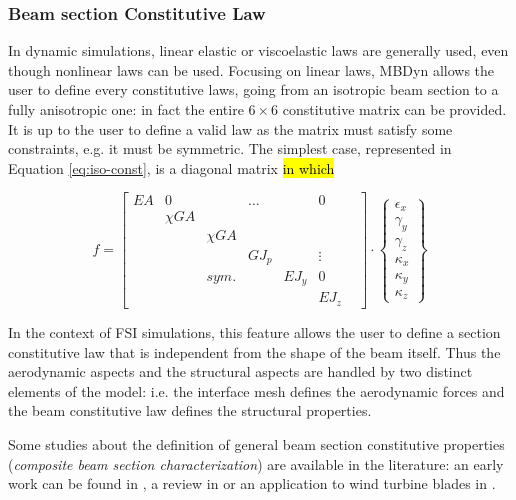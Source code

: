 \subsubsection{Beam section Constitutive Law}

In dynamic simulations, linear elastic or viscoelastic laws are generally used, even though nonlinear laws can be used.  Focusing on linear laws, MBDyn allows the user to define every constitutive laws, going from an isotropic beam section to a fully anisotropic one: in fact the entire $6 \times 6$ constitutive matrix can be provided. It is up to the user to define a valid law as the matrix must satisfy some constraints, e.g. it must be symmetric. The simplest case, represented in Equation \ref{eq:iso-const}, is a diagonal matrix \hl{in which} 

\begin{equation}
    f = \begin{bmatrix} EA & 0 & & \ldots &  & 0 \\
                          & \chi GA &  & & & &  \\
                          & & \chi GA & & & \\
                          & & & GJ_p & & \vdots \\
                          & &  sym. & & EJ_y & 0 \\
                          & & & & & EJ_z
    \end{bmatrix} \cdot 
    \begin{Bmatrix}
		\epsilon_x \\ \gamma_y \\ \gamma_z \\ \kappa_x \\ \kappa_y \\ \kappa_z
	\end{Bmatrix}
    \label{eq:iso-const}
\end{equation}


In the context of FSI simulations, this feature allows the user to define a section constitutive law that is independent from the shape of the beam itself. Thus the aerodynamic aspects and the structural aspects are handled by two distinct elements of the model: i.e. the interface mesh defines the aerodynamic forces and the beam constitutive law defines the structural properties.   

Some studies about the definition of general beam section constitutive properties (\textit{composite beam section characterization}) are available in the literature: an early work can be found in \cite{giavotto1983anisotropic}, a review in \cite{hodges1990review} or an application to wind turbine blades in \cite{kim2013development}.


